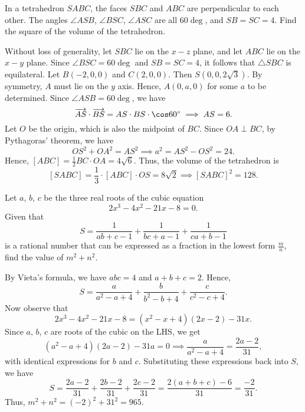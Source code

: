 \begin{question}[128]\label{A::2024-S-1-13}
    In a tetrahedron $SABC$, the faces $SBC$ and $ABC$ are perpendicular to each other. The angles $\angle ASB$, $\angle BSC$, $\angle ASC$ are all $60\deg$, and $SB = SC = 4$. Find the square of the volume of the tetrahedron.

    \begin{center}
    \end{center}
\end{question}
\begin{solution*}
    Without loss of generality, let $SBC$ lie on the $x-z$ plane, and let $ABC$ lie on the $x-y$ plane. Since $\angle BSC = 60\deg$ and $SB = SC = 4$, it follows that $\triangle SBC$ is equilateral. Let $B(-2, 0, 0)$ and $C(2, 0, 0)$. Then $S(0, 0, 2\sqrt3)$. By symmetry, $A$ must lie on the $y$ axis. Hence, $A(0, a, 0)$ for some $a$ to be determined. Since $\angle ASB = 60\deg$, we have \[\oa{AS} \dotp \oa{BS} = AS \cdot BS \cdot \cos 60\deg \implies AS = 6.\] Let $O$ be the origin, which is also the midpoint of $BC$. Since $OA \perp BC$, by Pythagoras' theorem, we have \[OS^2 + OA^2 = AS^2 \implies a^2 = AS^2 - OS^2 = 24.\] Hence, $[ABC] = \frac12 BC \cdot OA = 4\sqrt6$. Thus, the volume of the tetrahedron is \[[SABC] = \frac13 \cdot [ABC] \cdot OS = 8\sqrt{2} \implies [SABC]^2 = 128.\]
\end{solution*}

\begin{question}[965]\label{A::2024-S-1-14}
    Let $a$, $b$, $c$ be the three real roots of the cubic equation \[2x^3 - 4x^2 - 21x - 8 = 0.\] Given that \[S = \frac1{ab + c -1} + \frac1{bc + a -1} + \frac1{ca + b - 1}\] is a rational number that can be expressed as a fraction in the lowest form $\frac{m}{n}$, find the value of $m^2 + n^2$.
\end{question}
\begin{solution*}
    By Vieta's formula, we have $abc = 4$ and $a + b + c = 2$. Hence, \[S = \frac{a}{a^2 - a + 4} + \frac{b}{b^2 - b + 4} + \frac{c}{c^2 - c + 4}.\] Now observe that \[2x^3 - 4x^2 - 21x - 8 = (x^2 - x + 4)(2x - 2) - 31 x.\] Since $a$, $b$, $c$ are roots of the cubic on the LHS, we get \[(a^2 - a + 4)(2a - 2) - 31a = 0 \implies \frac{a}{a^2 - a + 4} = \frac{2a - 2}{31},\] with identical expressions for $b$ and $c$. Substituting these expressions back into $S$, we have \[S = \frac{2a - 2}{31} + \frac{2b - 2}{31} + \frac{2c - 2}{31} = \frac{2(a+b+c) - 6}{31} = \frac{-2}{31}.\] Thus, $m^2 + n^2 = (-2)^2 + 31^2 = 965$.
\end{solution*}

